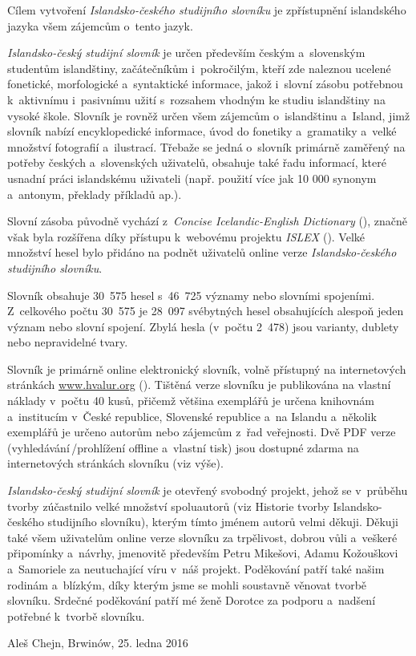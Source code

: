 Cílem vytvoření\textit{ Islandsko-českého studijního slovníku} je zpřístupnění islandského jazyka všem zájemcům o~tento jazyk. 

\textit{Islandsko-český studijní slovník} je určen především českým a~slovenským studentům islandštiny, začátečníkům i~pokročilým, kteří zde naleznou ucelené fonetické, morfologické a~syntaktické informace, jakož
i~slovní zásobu potřebnou k~aktivnímu i~pasivnímu užití s~rozsahem vhodným ke studiu islandštiny na vysoké škole.
Slovník je rovněž určen všem zájemcům o~islandštinu a~Island, jimž slovník nabízí encyklopedické informace, úvod do fonetiky a~gramatiky a~velké množství fotografií a~ilustrací. 
Třebaže se jedná o~slovník primárně zaměřený na potřeby českých a~slovenských uživatelů, obsahuje také řadu informací, které usnadní práci islandskému uživateli (např. použití více jak 10 000 synonym a~antonym, překlady příkladů ap.).

Slovní zásoba původně vychází z~\textit{Concise Icelandic-English Dictionary} (\cite {ic_en}), značně však byla rozšířena díky přístupu k~webovému projektu \textit{ISLEX} (\cite {int1}). Velké množství hesel bylo
přidáno na podnět uživatelů online verze \textit{Islandsko-českého studijního slovníku}.

Slovník obsahuje 30~575 hesel s~46~725 významy nebo slovními spojeními. Z~celkového počtu 30~575 je 28~097 svébytných hesel obsahujících alespoň jeden význam nebo slovní spojení. 
Zbylá hesla (v~počtu 2~478) jsou varianty, dublety nebo nepravidelné tvary.

Slovník je primárně online elektronický slovník, volně přístupný na internetových stránkách \url{www.hvalur.org}  (\cite {int14}). 
Tištěná verze slovníku je publikována na vlastní náklady v~počtu 40 kusů, přičemž většina exemplářů je určena knihovnám a~institucím v~České republice, Slovenské republice a~na Islandu
a~několik exemplářů je určeno autorům nebo zájemcům z~řad veřejnosti. Dvě PDF verze (vyhledávání\,/\addthin prohlížení offline a~vlastní tisk) jsou dostupné zdarma na internetových stránkách slovníku (viz výše).

\textit{Islandsko-český studijní slovník} je otevřený svobodný projekt, jehož se v~průběhu tvorby zúčastnilo velké množství spoluautorů (viz Historie tvorby Islandsko-českého studijního slovníku), kterým tímto jménem autorů velmi děkuji.
Děkuji také všem uživatelům online verze slovníku za trpělivost, dobrou vůli a~veškeré připomínky a~návrhy, jmenovitě především Petru Mikešovi, Adamu Kožouškovi a~Samoriele za neutuchající víru v~náš projekt.
Poděkování patří také našim rodinám a~blízkým, díky kterým jsme se mohli soustavně věnovat tvorbě slovníku.
Srdečné poděkování patří mé ženě Dorotce za podporu a~nadšení potřebné k~tvorbě slovníku.

\blspace[5]

{\centering Aleš Chejn, Brwinów, 25. ledna 2016\par}
